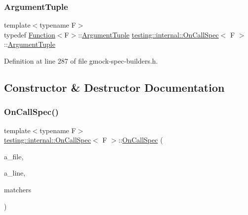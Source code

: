 \subsubsection{\texorpdfstring{Argument\+Tuple}{ArgumentTuple}}
{\footnotesize\ttfamily template$<$typename F$>$ \\
typedef \hyperlink{structtesting_1_1internal_1_1Function}{Function}$<$F$>$\+::\hyperlink{classtesting_1_1internal_1_1OnCallSpec_a70ffab8b915b7b48a90f5ce256da806f}{Argument\+Tuple} \hyperlink{classtesting_1_1internal_1_1OnCallSpec}{testing\+::internal\+::\+On\+Call\+Spec}$<$ F $>$\+::\hyperlink{classtesting_1_1internal_1_1OnCallSpec_a70ffab8b915b7b48a90f5ce256da806f}{Argument\+Tuple}}



Definition at line 287 of file gmock-\/spec-\/builders.\+h.



\subsection{Constructor \& Destructor Documentation}
\mbox{\label{classtesting_1_1internal_1_1OnCallSpec_ac7077e8162a10714e463b64a3cc7d054}} 
\subsubsection{\texorpdfstring{On\+Call\+Spec()}{OnCallSpec()}}
{\footnotesize\ttfamily template$<$typename F$>$ \\
\hyperlink{classtesting_1_1internal_1_1OnCallSpec}{testing\+::internal\+::\+On\+Call\+Spec}$<$ F $>$\+::\hyperlink{classtesting_1_1internal_1_1OnCallSpec}{On\+Call\+Spec} (\begin{DoxyParamCaption}\item[{const char $\ast$}]{a\+\_\+file,  }\item[{int}]{a\+\_\+line,  }\item[{const \hyperlink{classtesting_1_1internal_1_1OnCallSpec_a3240f159f0a9d8cda208bc256da35074}{Argument\+Matcher\+Tuple} \&}]{matchers }\end{DoxyParamCaption})\hspace{0.3cm}{\ttfamily [inline]}}



